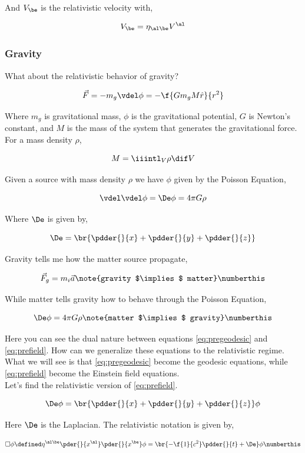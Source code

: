 \documentclass{article}
\begin{document}
And $V_\be$ is the relativistic velocity with,

\[  V_\be = \eta_{\al\be}V^\al \]

\subsubsection{Gravity}

What about the relativistic behavior of gravity?

\[ \vec{F} = - m_g \vdel \phi  = - \f{Gm_g M \hat{r}}{r^2}\]

Where $m_g$ is gravitational mass, $\phi$ is the gravitational potential, $G$ is Newton's constant, and $M$ is the mass of the system that generates the gravitational force. For a mass density $\rho$,

\[ M = \iiintl_{V} \rho \dif V \]

Given a source with mass density $\rho$ we have $\phi$ given by the Poisson Equation,

\[ \vdel \vdel \phi = \De \phi = 4\pi G\rho \]

Where $\De$ is given by,

\[ \De = \br{\pdder{}{x} + \pdder{}{y} + \pdder{}{z}} \]

Gravity tells me how the matter source propagate,

\[ \vec{F}_g  = m_i \vec{a} \note{gravity $\implies$ matter} \numberthis \label{eq:pregeodesic}\]

While matter tells gravity how to behave through the Poisson Equation,

\[ \De \phi = 4\pi G \rho \note{matter $\implies$ gravity} \numberthis \label{eq:prefield}\]

Here you can see the dual nature between equations \eqref{eq:pregeodesic} and \eqref{eq:prefield}. How can we generalize these equations to the relativistic regime. What we will see is that \eqref{eq:pregeodesic} become the geodesic equations, while \eqref{eq:prefield} become the Einstein field equations. \\

Let's find the relativistic version of \eqref{eq:prefield}.

\[ \De \phi = \br{\pdder{}{x} + \pdder{}{y} + \pdder{}{z} } \phi \]

Here $\De$ is the Laplacian. The relativistic notation is given by,

\[ \Box \phi \defined \eta^{\al\be} \pder{}{x^\al} \pder{}{x^\be} \phi = \br{-\f{1}{c^2}\pdder{}{t} + \De} \phi \numberthis \label{eq:alembert}\]
\end{document}
